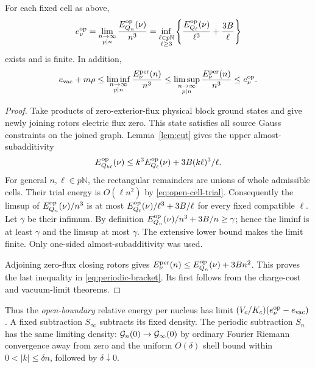 \begin{theorem}
\label{thm:open-source}
For each fixed cell as above,
\begin{equation}
 e_\nu^{\rm op}
 =\lim_{\substack{n\to\infty\\p\mid n}}
       \frac{E_{Q_n}^{\rm op}(\nu)}{n^3}
 =\inf_{\substack{\ell\in p\mathbb N\\\ell\ge3}}
   \left\{\frac{E_{Q_\ell}^{\rm op}(\nu)}{\ell^3}
                      +\frac{3B}{\ell}\right\}
 \label{eq:open-source-limit}
\end{equation}
exists and is finite. In addition,
\begin{equation}
 e_{\mathrm{vac}}+m\rho
 \le\liminf_{\substack{n\to\infty\\p\mid n}}\frac{E_\nu^{\rm per}(n)}{n^3}
 \le\limsup_{\substack{n\to\infty\\p\mid n}}\frac{E_\nu^{\rm per}(n)}{n^3}
 \le e_\nu^{\rm op}.
 \label{eq:periodic-bracket}
\end{equation}
\end{theorem}
\begin{proof}
Take products of zero-exterior-flux physical block ground states
and give newly joining rotors electric flux zero. This state
satisfies all source Gauss constraints on the joined graph.
Lemma~\ref{lem:cut} gives the upper almost-subadditivity
\[
 E_{Q_{k\ell}}^{\rm op}(\nu)
 \le k^3E_{Q_\ell}^{\rm op}(\nu)+3B(k\ell)^3/\ell.
\]
For general $n,\ell\in p\mathbb N$, the rectangular remainders
are unions of whole admissible cells. Their trial energy is
$O(\ell n^2)$ by \eqref{eq:open-cell-trial}. Consequently
the limsup of $E_{Q_n}^{\rm op}(\nu)/n^3$ is at most
$E_{Q_\ell}^{\rm op}(\nu)/\ell^3+3B/\ell$ for every fixed
compatible $\ell$. Let $\gamma$ be their infimum.
By definition $E_{Q_n}^{\rm op}(\nu)/n^3+3B/n\ge\gamma$;
hence the liminf is at least $\gamma$ and the limsup at most
$\gamma$. The extensive lower bound makes the limit finite.
Only one-sided almost-subadditivity was used.

Adjoining zero-flux closing rotors gives
$E_\nu^{\rm per}(n)\le E_{Q_n}^{\rm op}(\nu)+3Bn^2$.
This proves the last inequality in \eqref{eq:periodic-bracket}.
Its first follows from the charge-cost and vacuum-limit theorems.
\end{proof}

Thus the \emph{open-boundary} relative energy per nucleus has
limit $(V_c/K_c)(e_\nu^{\rm op}-e_{\mathrm{vac}})$.
A fixed subtraction $S_\infty$ subtracts its fixed density.
The periodic subtraction $S_n$ has the same limiting density:
$\mathcal G_n(0)\to\mathcal G_\infty(0)$ by ordinary Fourier Riemann convergence
away from zero and the uniform $O(\delta)$ shell bound within
$0<|k|\le\delta n$, followed by $\delta\downarrow0$.

